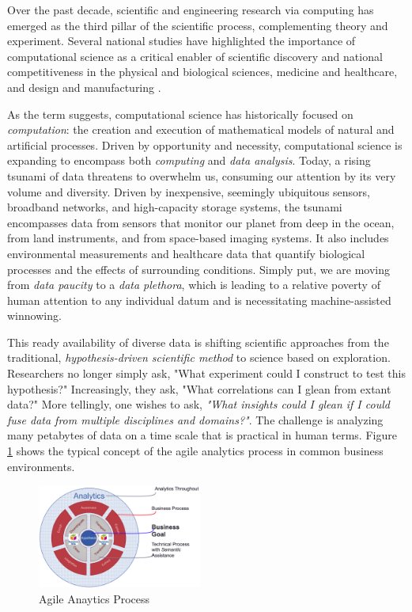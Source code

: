 \documentclass[twocolumn]{article}
\begin{document}
Over the past decade, scientific and engineering research via computing has emerged as the third pillar of the scientific process, complementing theory and experiment. Several national studies have highlighted the importance of computational science as a critical enabler of scientific discovery and national competitiveness in the physical and biological sciences, medicine and healthcare, and design and manufacturing \cite{NITRD:2005, Reed:2003, Graham:2004}. 

As the term suggests, computational science has historically focused on \emph{computation}: the creation and execution of mathematical models of natural and artificial processes. Driven by opportunity and necessity, computational science is expanding to encompass both \emph{computing} and \emph{data analysis}. Today, a rising tsunami of data threatens to overwhelm us, consuming our attention by its very volume and diversity. Driven by inexpensive, seemingly ubiquitous sensors, broadband networks, and high-capacity storage systems, the tsunami encompasses data from sensors that monitor our planet from deep in the ocean, from land instruments, and from space-based imaging systems. It also includes environmental measurements and healthcare data that quantify biological processes and the effects of surrounding conditions. Simply put, we are moving from \emph{data paucity} to a \emph{data plethora}, which is leading to a relative poverty of human attention to any individual datum and is necessitating machine-assisted winnowing.

This ready availability of diverse data is shifting scientific approaches from the
traditional, \emph{hypothesis-driven scientific method} to science based on exploration. Researchers no longer simply ask, "What experiment could I construct to test this hypothesis?" Increasingly, they ask, "What correlations can I glean from extant data?" More tellingly, one wishes to ask, \emph{"What insights could I glean if I could fuse data from multiple disciplines and domains?"}. 
 The challenge is analyzing many petabytes of data on a time scale that is practical in human terms.
Figure \ref{Analytics} shows the typical concept of the agile analytics process in common business environments.
\begin{figure}[htb]
	\centering
	\includegraphics[width=0.48\textwidth]{AnalyticProcess}
	\caption{Agile Anaytics Process}
	\label{Analytics}
\end{figure}
\end{document}
